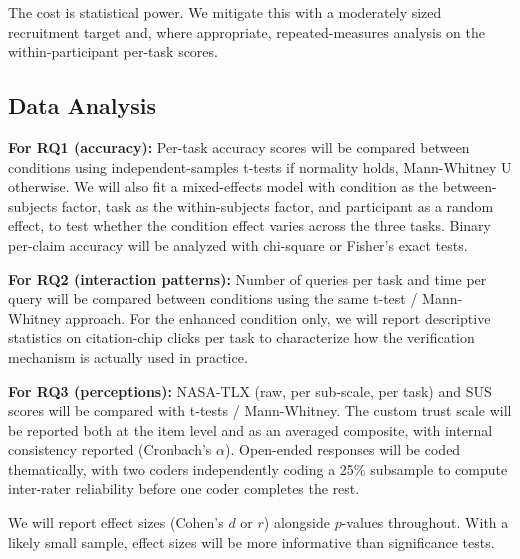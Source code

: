 The cost is statistical power. We mitigate this with a moderately sized recruitment target and, where appropriate, repeated-measures analysis on the within-participant per-task scores.

\subsection{Data Analysis}

\textbf{For RQ1 (accuracy):} Per-task accuracy scores will be compared between conditions using independent-samples t-tests if normality holds, Mann-Whitney U otherwise. We will also fit a mixed-effects model with condition as the between-subjects factor, task as the within-subjects factor, and participant as a random effect, to test whether the condition effect varies across the three tasks. Binary per-claim accuracy will be analyzed with chi-square or Fisher's exact tests.

\textbf{For RQ2 (interaction patterns):} Number of queries per task and time per query will be compared between conditions using the same t-test / Mann-Whitney approach. For the enhanced condition only, we will report descriptive statistics on citation-chip clicks per task to characterize how the verification mechanism is actually used in practice.

\textbf{For RQ3 (perceptions):} NASA-TLX (raw, per sub-scale, per task) and SUS scores will be compared with t-tests / Mann-Whitney. The custom trust scale will be reported both at the item level and as an averaged composite, with internal consistency reported (Cronbach's $\alpha$). Open-ended responses will be coded thematically, with two coders independently coding a 25\% subsample to compute inter-rater reliability before one coder completes the rest.

We will report effect sizes (Cohen's $d$ or $r$) alongside $p$-values throughout. With a likely small sample, effect sizes will be more informative than significance tests.

